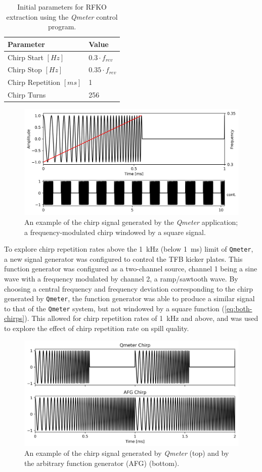 \documentclass[11pt]{report}
\begin{document}
\begin{table}[]
  \centering
  \begin{tabular}{ll}
    \centering
  Parameter                 & Value                  \\ \hline \hline
  Chirp Start $[Hz]$        & $0.3\cdot f_{rev}$     \\
  Chirp Stop $[Hz]$         & $0.35\cdot f_{rev}$    \\
  Chirp Repetition $[ms]$   & 1                      \\
  Chirp Turns               & 256                   
  \end{tabular}
  \caption{Initial parameters for RFKO extraction using the \textit{Qmeter} control program.}\label{tab:qmeter-params}
\end{table}

\begin{figure}
  \centering
  \includegraphics[width=0.6\linewidth]{fake-signal.png}
  \caption{An example of the chirp signal generated by the \textit{Qmeter} application; a frequency-modulated chirp windowed by a square signal.}\label{fig:qmeter-signal}
\end{figure}

To explore chirp repetition rates above the \qty{1}{\kilo\hertz} (below \qty{1}{\milli\second}) limit of \verb|Qmeter|, a new signal generator was configured to control the TFB kicker plates. This function generator was configured as a two-channel source, channel 1 being a sine wave with a frequency modulated by channel 2, a ramp/sawtooth wave. By choosing a central frequency and frequency deviation corresponding to the chirp generated by \verb|Qmeter|, the function generator was able to produce a similar signal to that of the \verb|Qmeter| system, but not windowed by a square function (\autoref{eq:both-chirps}). This allowed for chirp repetition rates of \qty{1}{\kilo\hertz} and above, and was used to explore the effect of chirp repetition rate on spill quality.

\begin{figure}
  \centering
  \includegraphics[width=0.6\linewidth]{both-chirps.png}
  \caption{An example of the chirp signal generated by \textit{Qmeter} (top) and by the arbitrary function generator (AFG) (bottom).}\label{eq:both-chirps}
\end{figure}
\end{document}
